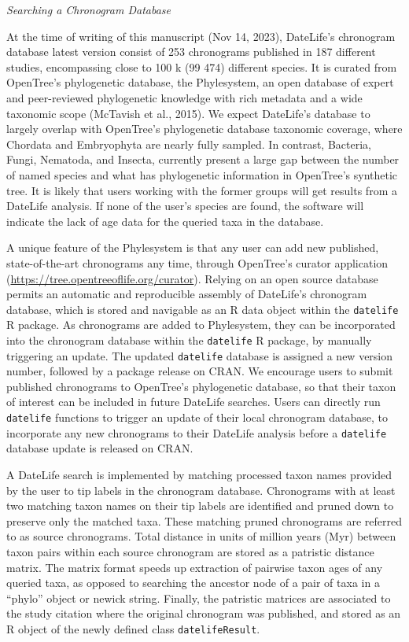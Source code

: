 \documentclass[english,man]{apa6}
\begin{document}
\begin{center}
\emph{Searching a Chronogram Database}
\end{center}

At the time of writing of this manuscript
(Nov 14, 2023),
DateLife's chronogram database latest version consist of 253 chronograms published in 187 different studies, encompassing close to 100 k (99 474) different species. It is curated from OpenTree's phylogenetic database, the Phylesystem, an open database of expert and peer-reviewed phylogenetic knowledge with rich metadata and a wide taxonomic scope (McTavish et al., 2015). We expect DateLife's database to largely overlap with OpenTree's phylogenetic database taxonomic coverage, where Chordata and Embryophyta are nearly fully sampled. In contrast, Bacteria, Fungi, Nematoda, and Insecta, currently present a large gap between the number of named species and what has phylogenetic information in OpenTree's synthetic tree. It is likely that users working with the former groups will get results from a DateLife analysis. If none of the user's species are found, the software will indicate the lack of age data for the queried taxa in the database.

A unique feature of the Phylesystem is that any user can add new published, state-of-the-art chronograms any time, through OpenTree's curator application (\url{https://tree.opentreeoflife.org/curator}). Relying on an open source database permits an automatic and reproducible assembly of DateLife's chronogram database, which is stored and navigable as an R data object within the \texttt{datelife} R package. As chronograms are added to Phylesystem, they can be incorporated into the chronogram database within the \texttt{datelife} R package, by manually triggering an update. The updated \texttt{datelife} database is assigned a new version number, followed by a package release on CRAN.
We encourage users to submit published chronograms to OpenTree's phylogenetic database, so that their taxon of interest can be included in future DateLife searches.
Users can directly run \texttt{datelife} functions to trigger an update of their local chronogram database, to incorporate any new chronograms to their DateLife analysis before a \texttt{datelife} database update is released on CRAN.

A DateLife search is implemented by matching processed taxon names provided by the user to tip labels in the chronogram database. Chronograms with at least two matching taxon names on their tip labels are identified and pruned down to preserve only the matched taxa.
These matching pruned chronograms are referred to as source chronograms.
Total distance in units of million years (Myr) between taxon pairs within each source chronogram are stored as a patristic distance matrix.
The matrix format speeds up extraction of pairwise taxon ages of any queried taxa, as opposed to searching the ancestor node of a pair of taxa in a \enquote{phylo} object or newick string.
Finally, the patristic matrices are associated to the study citation where the original chronogram was published, and stored as an R object of the newly defined class \texttt{datelifeResult}.
\end{document}
